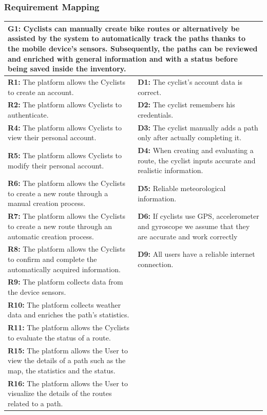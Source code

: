 \subsubsection{Requirement Mapping}
\begin{table}[h!]
\centering
\begin{tabular}{|p{7cm}|p{7cm}|}
\hline
\multicolumn{2}{|p{14cm}|}{\textbf{G1:} Cyclists can manually create bike routes or alternatively be assisted by the system to automatically track the paths thanks to the mobile device's sensors. Subsequently, the paths can be reviewed and enriched with general information and with a status before being saved inside the inventory.} \\ \hline
\textbf{R1:} The platform allows the Cyclists to create an account. &
\textbf{D1:} The cyclist’s account data is correct. \\ 
\textbf{R2:} The platform allows Cyclists to authenticate.& 
\textbf{D2:} The cyclist remembers his credentials.\\ 
\textbf{R4:} The platform allows Cyclists to view their personal account. & 
\textbf{D3:} The cyclist manually adds a path only after actually completing it.\\ 
\textbf{R5:} The platform allows Cyclists to modify their personal account. & 
\textbf{D4:} When creating and evaluating a route, the cyclist inputs accurate and realistic information.\\ 
\textbf{R6:} The platform allows the Cyclists to create a new route through a manual creation process. & 
\textbf{D5:} Reliable meteorological information.\\ 
\textbf{R7:} The platform allows the Cyclists to create a new route through an automatic creation process. & 
\textbf{D6:} If cyclists use GPS, accelerometer and gyroscope we assume that they are accurate and work correctly\\ 
\textbf{R8:} The platform allows the Cyclists to confirm and complete the automatically acquired information.& 
\textbf{D9:} All users have a reliable internet connection.
\\
\textbf{R9:} The platform collects data from the device sensors.&\\
\textbf{R10:} The platform collects weather data and enriches the path’s statistics.&\\
\textbf{R11:} The platform allows the Cyclists to evaluate the status of a route. &\\
\textbf{R15:} The platform allows the User to view the details of a path such as the map, the statistics and the status.&\\
\textbf{R16:} The platform allows the User to visualize the details of the routes related to a path.&\\
\hline
\end{tabular}
\end{table}
